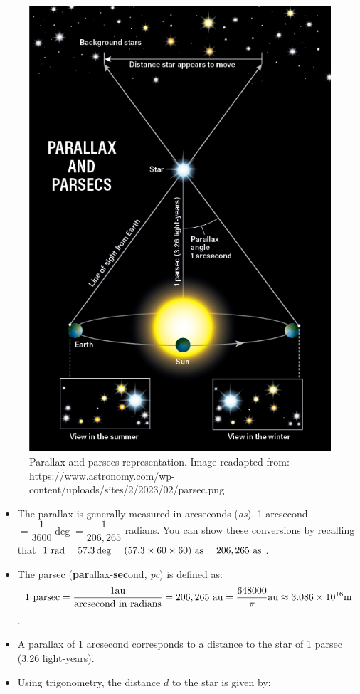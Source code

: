 \documentclass[
  letterpaper,
  DIV=11,
  numbers=noendperiod]{scrartcl}
\begin{document}
\begin{figure}

{\centering \includegraphics{img/parallax_parsecs.png}

}

\caption{Parallax and parsecs representation. Image readapted from:
https://www.astronomy.com/wp-content/uploads/sites/2/2023/02/parsec.png}

\end{figure}

\begin{itemize}
\item
  The parallax is generally measured in arcseconds (\emph{as}). 1
  arcsecond \(= \dfrac{1}{3600} \deg = \dfrac{1}{206,265}\) radians. You
  can show these conversions by recalling that
  \(1\ \rm{rad} = 57.3\deg = (57.3\times 60\times 60)\ \rm{as}=206,265\ \rm{as}\).
\item
  The parsec (\textbf{par}allax-\textbf{sec}ond, \emph{pc}) is defined
  as:
  \[ 1\ \rm{parsec} = \dfrac{1 au}{\rm{arcsecond\  in\  radians}} = 206,265\ au= \dfrac{648000}{\pi} \rm{au} \approx 3.086\times 10^{16}\rm{m}\].
\item
  A parallax of 1 arcsecond corresponds to a distance to the star of 1
  parsec (3.26 light-years).
\item
  Using trigonometry, the distance \(d\) to the star is given by:
\end{itemize}
\end{document}
